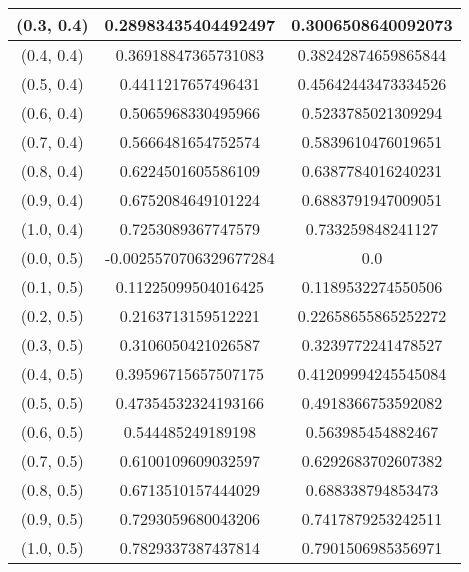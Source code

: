 \begin{table}[H]
\begin{tabular}{|c|c|c|}
\hline
(0.3, 0.4) & 0.28983435404492497 & 0.3006508640092073 \\
\hline
(0.4, 0.4) & 0.36918847365731083 & 0.38242874659865844 \\
\hline
(0.5, 0.4) & 0.4411217657496431 & 0.45642443473334526 \\
\hline
(0.6, 0.4) & 0.5065968330495966 & 0.5233785021309294 \\
\hline
(0.7, 0.4) & 0.5666481654752574 & 0.5839610476019651 \\
\hline
(0.8, 0.4) & 0.6224501605586109 & 0.6387784016240231 \\
\hline
(0.9, 0.4) & 0.6752084649101224 & 0.6883791947009051 \\
\hline
(1.0, 0.4) & 0.7253089367747579 & 0.733259848241127 \\
\hline
\hline
(0.0, 0.5) & -0.0025570706329677284 & 0.0 \\
\hline
(0.1, 0.5) & 0.11225099504016425 & 0.1189532274550506 \\
\hline
(0.2, 0.5) & 0.2163713159512221 & 0.22658655865252272 \\
\hline
(0.3, 0.5) & 0.3106050421026587 & 0.3239772241478527 \\
\hline
(0.4, 0.5) & 0.39596715657507175 & 0.41209994245545084 \\
\hline
(0.5, 0.5) & 0.47354532324193166 & 0.4918366753592082 \\
\hline
(0.6, 0.5) & 0.544485249189198 & 0.563985454882467 \\
\hline
(0.7, 0.5) & 0.6100109609032597 & 0.6292683702607382 \\
\hline
(0.8, 0.5) & 0.6713510157444029 & 0.688338794853473 \\
\hline
(0.9, 0.5) & 0.7293059680043206 & 0.7417879253242511 \\
\hline
(1.0, 0.5) & 0.7829337387437814 & 0.7901506985356971 \\
\hline
\end{tabular}
\end{table}
